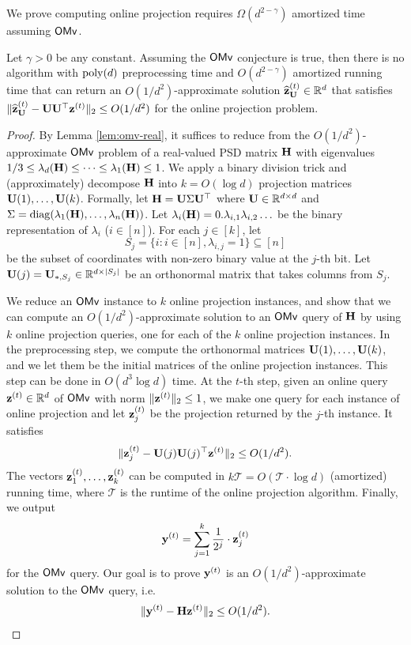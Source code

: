 We prove computing online projection requires $\Omega(d^{2-\gamma})$ amortized time assuming $\mathsf{OMv}$.
\begin{lemma}
\label{lem:online-projection}
Let $\gamma > 0$ be any constant. Assuming the $\mathsf{OMv}$ conjecture is true, then there is no algorithm with $\operatorname{poly}(d)$ preprocessing time and $O(d^{2-\gamma})$ amortized running time that can return an $O(1/d^2)$-approximate solution $\widehat{\mathbf{z}}^{{(t)}}_{\mathbf{U}} \in \mathbb{R}^d$ that satisfies $\|\widehat{\mathbf{z}}^{{(t)}}_{\mathbf{U}} - \mathbf{U}\mathbf{U}^{\top} \mathbf{z}^{(t)}\|_2 \leq O(1/d^2)$ for the online projection problem.
\end{lemma}
\begin{proof}
By Lemma \ref{lem:omv-real}, it suffices to reduce from the $O(1/d^2)$-approximate $\mathsf{OMv}$ problem of a real-valued PSD matrix $\mathbf{H}$ with eigenvalues $1/3 \leq \lambda_d(\mathbf{H}) \leq \cdots \leq \lambda_1(\mathbf{H}) \leq 1$.
We apply a binary division trick and (approximately) decompose $\mathbf{H}$ into $k = O(\log d)$ projection matrices $\mathbf{U}(1), \ldots, \mathbf{U}(k)$.
Formally, let $\mathbf{H} = \mathbf{U}\Sigma \mathbf{U}^{\top}$ where $\mathbf{U} \in \mathbb{R}^{d\times d}$ and $\Sigma = \operatorname{diag}(\lambda_1(\mathbf{H}), \ldots, \lambda_n(\mathbf{H}))$.
Let $\lambda_{i}(\mathbf{H}) =0.\lambda_{i,1}\lambda_{i,2}\ldots$ be the binary representation of $\lambda_i$ ($i \in [n]$).
For each $j \in [k]$, let 
\[
S_j = \{i:  i\in [n], \lambda_{i, j} = 1\} \subseteq [n]
\]
be the subset of coordinates with non-zero binary value at the $j$-th bit. Let $\mathbf{U}(j) = \mathbf{U}_{*,S_j} \in \mathbb{R}^{d\times |S_j|}$ be an orthonormal matrix that takes columns from $S_j$.





We reduce an $\mathsf{OMv}$ instance to $k$ online projection instances, and show that we can compute an $O(1/d^2)$-approximate solution to an $\mathsf{OMv}$ query of $\mathbf{H}$ by using $k$ online projection queries, one for each of the $k$ online projection instances. 
In the preprocessing step, we compute the orthonormal matrices $\mathbf{U}(1), \ldots, \mathbf{U}(k)$, and we let them be the initial matrices of the online projection instances. This step can be done in $O(d^3\log d)$ time. 
At the $t$-th step, given an online query $\mathbf{z}^{(t)} \in \mathbb{R}^d$ of $\mathsf{OMv}$ with norm $\|\mathbf{z}^{(t)}\|_2 \leq 1$, we make one query for each instance of online projection and let $\mathbf{z}_j^{(t)}$ be the projection returned by the $j$-th instance.
It satisfies 
\begin{align}
\|\mathbf{z}^{{(t)}}_{j} - \mathbf{U}(j)\mathbf{U}(j)^{\top}\mathbf{z}^{(t)}\|_2 \leq O(1/d^2). \label{eq:online-proj-guarantee}
\end{align}
The vectors $\mathbf{z}^{(t)}_1, \ldots, \mathbf{z}^{(t)}_k$ can be computed in $k \mathcal{T} = O(\mathcal{T} \cdot \log d)$ (amortized) running time, where $\mathcal{T}$ is the runtime of the online projection algorithm. Finally, we output
\begin{align}
\mathbf{y}^{(t)} = \sum_{j=1}^{k} \frac{1}{2^j} \cdot \mathbf{z}^{(t)}_j \label{eq:omv-output}
\end{align}
for the $\mathsf{OMv}$ query.
Our goal is to prove $\mathbf{y}^{(t)}$ is an $O(1/d^2)$-approximate solution to the $\mathsf{OMv}$ query, i.e. 
\begin{align}\label{eq:omv_error}
\|\mathbf{y}^{(t)} - \mathbf{H}\mathbf{z}^{(t)}\|_2 \leq O(1/d^2).
\end{align}


\end{proof}
